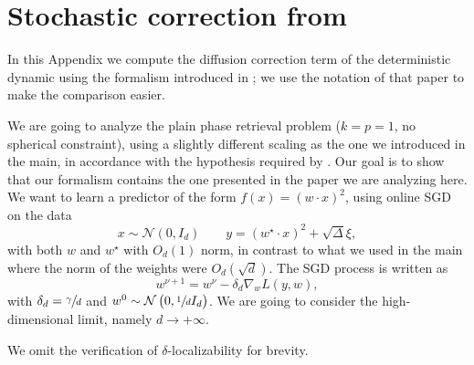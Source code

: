 \section{Stochastic correction from \texorpdfstring{\cite{arous2022high}}{[arous2022high]}}

\label{2305:app:match_with_GBA}
In this Appendix we compute the diffusion correction term of the deterministic dynamic using the formalism introduced in \cite{arous2022high}; we use the notation of that paper to make the comparison easier.

We are going to analyze the plain phase retrieval problem (\(k=p=1\), no spherical constraint), using a slightly different scaling as the one we introduced in the main, in accordance with the hypothesis required by \cite{arous2022high}. Our goal is to show that our formalism contains the one presented in the paper we are analyzing here. We want to learn a predictor of the form \(f(x)=(w\cdot x)^2\), using online SGD on the data
\[x\sim \mathcal N (0,I_d) \qquad y = (w^\star \cdot x)^2 + \sqrt{\Delta} \xi, \]
with both \(w\) and \(w^\star\) with \(O_d(1)\) norm, in contrast to what we used in the main where the norm of the weights were \(O_d(\sqrt{d})\).
The SGD process is written as
\[
w^{\nu+1} = w^{\nu} - \delta_d \nabla_w L(y,w),
\]
with \(\delta_d = \sfrac\gamma d\) and \(w^0\sim\mathcal N\left(0,\sfrac1 d I_d\right)\). 
We are going to consider the high-dimensional limit, namely \({d\to+\infty}\).

We omit the verification of \(\delta\)-localizability for brevity. 

